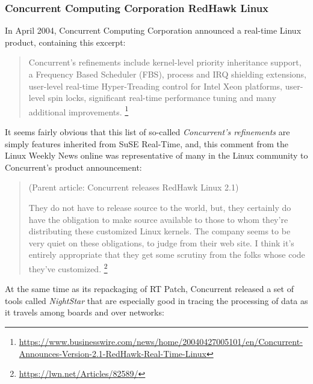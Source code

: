 \documentclass[12pt]{article}
\begin{document}
\subsubsection{Concurrent Computing Corporation RedHawk Linux}

In April 2004, Concurrent Computing Corporation announced a real-time
Linux product, containing this excerpt:

\begin{quote}
Concurrent's refinements include kernel-level priority inheritance support,
a Frequency Based Scheduler (FBS), process and IRQ shielding extensions,
user-level real-time Hyper-Treading control for Intel Xeon platforms,
user-level spin locks, significant real-time performance tuning and
many additional improvements.%
\footnote{\url{https://www.businesswire.com/news/home/20040427005101/en/Concurrent-Announces-Version-2.1-RedHawk-Real-Time-Linux}}
\end{quote}

It seems fairly obvious that this list of so-called \emph{Concurrent's refinements}
are simply features inherited from SuSE Real-Time, and, this comment from the Linux
Weekly News online was representative of many in the Linux community to
Concurrent's product announcement:

\begin{quote}
(Parent article: Concurrent releases RedHawk Linux 2.1)

They do not have to release source to the world, but,
they certainly do have the obligation to make source
available to those to whom they're distributing these
customized Linux kernels. The company seems to be very quiet on these
obligations, to judge from their web site. I think it's entirely
appropriate that they get some scrutiny from the folks
whose code they've customized.%
\footnote{\url{https://lwn.net/Articles/82589/}}
\end{quote}

At the same time as its repackaging of RT Patch, Concurrent released a set of
tools called \emph{NightStar} that are especially good in tracing the processing
of data as it travels among boards and over networks:
\end{document}
